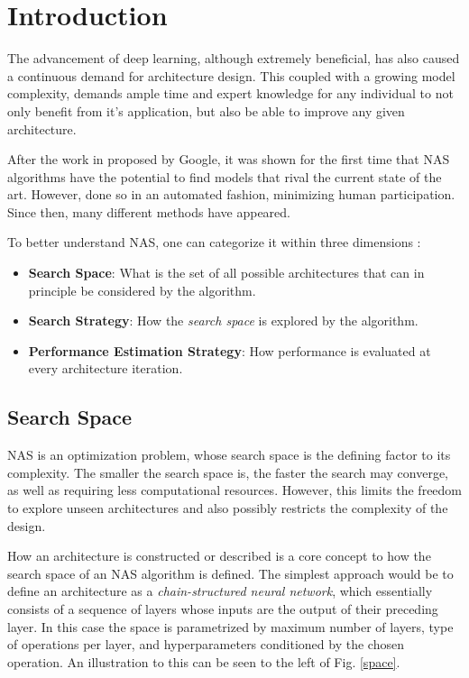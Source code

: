 \documentclass[10pt,        %
               a4paper,     %
               journal,     %
               ]{IEEEtran}
\begin{document}
\section{Introduction}
The advancement of deep learning, although extremely beneficial, has also caused a continuous demand for
architecture design. This coupled with a growing model complexity, demands ample time and expert knowledge for
any individual to not only benefit from it's application, but also be able to improve any given architecture.

After the work in \cite{zoph2016neural} proposed by Google, it was shown for the first time that NAS algorithms
have the potential to find models that rival the current state of the art. However, done so in an automated fashion, minimizing
human participation. Since then, many different methods have appeared.

To better understand NAS, one can categorize it within three dimensions \cite{elsken2019neural}:
\begin{itemize}
    \item \textbf{Search Space}: What is the set of all possible architectures that can in principle be considered
    by the algorithm.

    \item \textbf{Search Strategy}: How the \textit{search space} is explored by the algorithm.

    \item \textbf{Performance Estimation Strategy}: How performance is evaluated at every architecture iteration.
\end{itemize}

\subsection{Search Space}
\label{search}
NAS is an optimization problem, whose search space is the defining factor to its complexity.
The smaller the search space is, the faster the search may converge,
as well as requiring less computational resources. However, this limits the freedom to
explore unseen architectures and also possibly restricts the complexity of the design.

How an architecture is constructed or described is a core concept to how the search space of an NAS algorithm is defined.
The simplest approach would be to define an architecture as a \textit{chain-structured neural network}, which essentially consists of a
sequence of layers whose inputs are the output of their preceding layer. In this case the space is parametrized by maximum number
of layers, type of operations per layer, and hyperparameters conditioned by the chosen operation. An illustration to this can be
seen to the left of Fig. \ref{space}.
\end{document}
